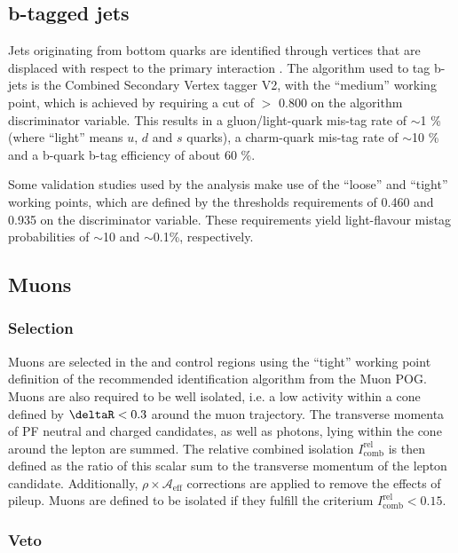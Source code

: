 \subsection{b-tagged jets}
\label{sec:btags}

Jets originating from bottom quarks are identified through vertices
that are displaced with respect to the primary interaction
\cite{Chatrchyan:2012jua}.  The algorithm used to tag b-jets is the
Combined Secondary Vertex tagger V2, with the ``medium'' working
point, which is achieved by requiring a cut of $>$ 0.800 on the
algorithm discriminator variable.  This results in a gluon/light-quark
mis-tag rate of $\sim$1 \% (where ``light'' means $u$, $d$ and $s$
quarks), a charm-quark mis-tag rate of $\sim$10 \% and a b-quark b-tag
efficiency of about 60 \%.

Some validation studies used by the analysis make use of the ``loose''
and ``tight'' working points, which are defined by the thresholds
requirements of 0.460 and 0.935 on the discriminator variable. These
requirements yield light-flavour mistag probabilities of $\sim$10 and
$\sim$0.1\%, respectively.

\subsection{Muons}
\label{sec:muon-id}

\subsubsection{Selection}

Muons are selected in the \mj and \mmj control regions using the
``tight'' working point definition of the recommended identification
algorithm from the Muon POG.  Muons are also required to be well
isolated, i.e. a low activity within a cone defined by $\deltaR < 0.3$
around the muon trajectory. The transverse momenta of PF neutral and
charged candidates, as well as photons, lying within the cone around
the lepton are summed. The relative combined isolation
$I^\mathrm{rel}_\mathrm{comb}$ is then defined as the ratio of this
scalar sum to the transverse momentum of the lepton
candidate. Additionally, $\rho\times \mathcal{A}_\textrm{eff}$
corrections are applied to remove the effects of pileup.  Muons are
defined to be isolated if they fulfill the criterium
$I^\mathrm{rel}_\mathrm{comb} < 0.15$.

\subsubsection{Veto}

